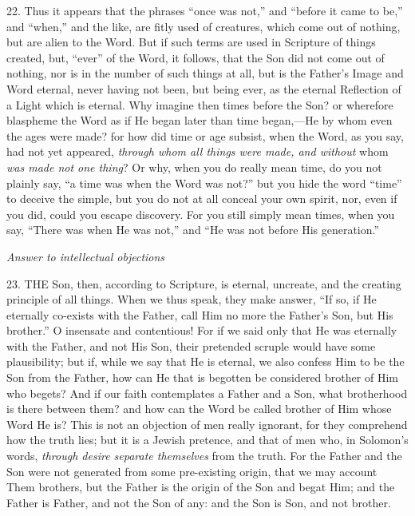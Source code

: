 22. Thus it appears that the
phrases ``once was not,'' and ``before it came to be,'' and ``when,'' and
the like, are fitly used of creatures, which come out of nothing, but
are alien to the Word. But if such terms are used in Scripture of
things created, but, ``ever'' of the Word, it follows, that the Son did
not come out of nothing, nor is in the number of such things at all,
but is the Father's Image and Word eternal, never having not been, but
being ever, as the eternal Reflection of a Light which is eternal. Why
imagine then times before the Son? or wherefore blaspheme the Word as
if He began later than time began,—He by whom even the ages were
made? for how did time or age subsist, when the Word, as you say, had
not yet appeared, \emph{through whom all things were made, and without}
whom \emph{was made not one thing}? Or why, when you do really mean
time, do you not plainly say, ``a time was when the Word was not?'' but
you hide the word ``time'' to deceive the simple, but you do not at all
conceal your own spirit, nor, even if you did, could you escape
discovery. For you still simply mean times, when you say, ``There was
when He was not,'' and ``He was not before His generation.''


\emph{Answer
to intellectual objections}

23. THE
Son, then, according to Scripture, is eternal, uncreate, and the
creating principle of all things. When we thus speak, they make
answer, ``If so, if He eternally co-exists with the Father, call Him no
more the Father's Son, but His brother.'' O insensate and contentious!
For if we said only that He was eternally with the Father, and not His
Son, their pretended scruple would have some plausibility; but if,
while we say that He is eternal, we also confess Him to be the Son
from the Father, how can He that is begotten be considered brother of
Him who begets? And if our faith contemplates a Father and a Son, what
brotherhood is there between them? and how can the Word be called
brother of Him whose Word He is? This is not an objection of men
really ignorant, for they comprehend how the truth lies; but it is a
Jewish pretence, and that of men who, in Solomon's words, \emph{through
desire separate themselves} from the truth. For the Father and the
Son were not generated from some pre-existing origin, that we may
account Them brothers, but the Father is the origin of the Son and
begat Him; and the Father is Father, and not the Son of any: and the
Son is Son, and not brother.

